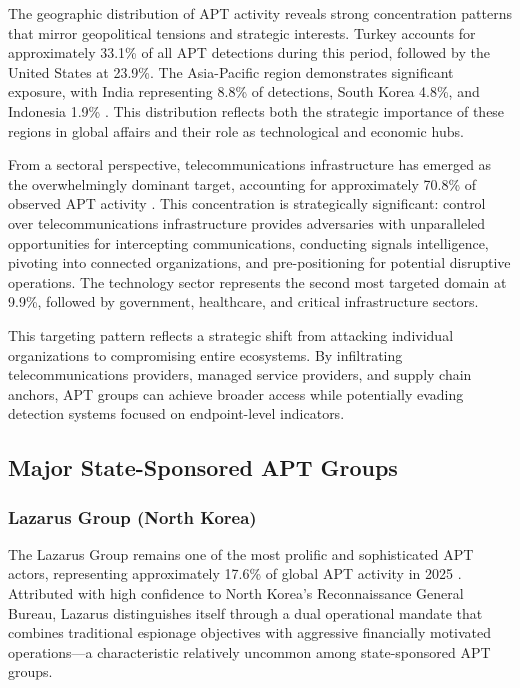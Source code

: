 The geographic distribution of APT activity reveals strong concentration patterns that mirror geopolitical tensions and strategic interests. Turkey accounts for approximately 33.1\% of all APT detections during this period, followed by the United States at 23.9\%. The Asia-Pacific region demonstrates significant exposure, with India representing 8.8\% of detections, South Korea 4.8\%, and Indonesia 1.9\% \cite{trellix2025}. This distribution reflects both the strategic importance of these regions in global affairs and their role as technological and economic hubs.

From a sectoral perspective, telecommunications infrastructure has emerged as the overwhelmingly dominant target, accounting for approximately 70.8\% of observed APT activity \cite{trellix2025}. This concentration is strategically significant: control over telecommunications infrastructure provides adversaries with unparalleled opportunities for intercepting communications, conducting signals intelligence, pivoting into connected organizations, and pre-positioning for potential disruptive operations. The technology sector represents the second most targeted domain at 9.9\%, followed by government, healthcare, and critical infrastructure sectors.

This targeting pattern reflects a strategic shift from attacking individual organizations to compromising entire ecosystems. By infiltrating telecommunications providers, managed service providers, and supply chain anchors, APT groups can achieve broader access while potentially evading detection systems focused on endpoint-level indicators.

\subsection{Major State-Sponsored APT Groups}

\subsubsection{Lazarus Group (North Korea)}

The Lazarus Group remains one of the most prolific and sophisticated APT actors, representing approximately 17.6\% of global APT activity in 2025 \cite{trellix2025}. Attributed with high confidence to North Korea's Reconnaissance General Bureau, Lazarus distinguishes itself through a dual operational mandate that combines traditional espionage objectives with aggressive financially motivated operations—a characteristic relatively uncommon among state-sponsored APT groups.

